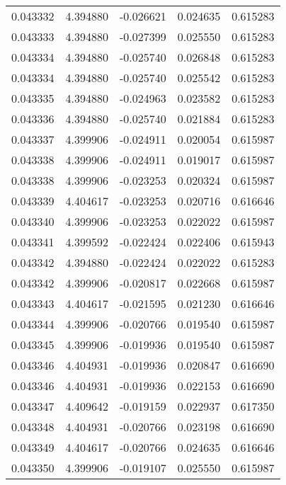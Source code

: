 \begin{tabular}{lrrrr}
0.043332    &  4.394880 & -0.026621 &  0.024635 &             0.615283 \\
0.043333    &  4.394880 & -0.027399 &  0.025550 &             0.615283 \\
0.043334    &  4.394880 & -0.025740 &  0.026848 &             0.615283 \\
0.043334    &  4.394880 & -0.025740 &  0.025542 &             0.615283 \\
0.043335    &  4.394880 & -0.024963 &  0.023582 &             0.615283 \\
0.043336    &  4.394880 & -0.025740 &  0.021884 &             0.615283 \\
0.043337    &  4.399906 & -0.024911 &  0.020054 &             0.615987 \\
0.043338    &  4.399906 & -0.024911 &  0.019017 &             0.615987 \\
0.043338    &  4.399906 & -0.023253 &  0.020324 &             0.615987 \\
0.043339    &  4.404617 & -0.023253 &  0.020716 &             0.616646 \\
0.043340    &  4.399906 & -0.023253 &  0.022022 &             0.615987 \\
0.043341    &  4.399592 & -0.022424 &  0.022406 &             0.615943 \\
0.043342    &  4.394880 & -0.022424 &  0.022022 &             0.615283 \\
0.043342    &  4.399906 & -0.020817 &  0.022668 &             0.615987 \\
0.043343    &  4.404617 & -0.021595 &  0.021230 &             0.616646 \\
0.043344    &  4.399906 & -0.020766 &  0.019540 &             0.615987 \\
0.043345    &  4.399906 & -0.019936 &  0.019540 &             0.615987 \\
0.043346    &  4.404931 & -0.019936 &  0.020847 &             0.616690 \\
0.043346    &  4.404931 & -0.019936 &  0.022153 &             0.616690 \\
0.043347    &  4.409642 & -0.019159 &  0.022937 &             0.617350 \\
0.043348    &  4.404931 & -0.020766 &  0.023198 &             0.616690 \\
0.043349    &  4.404617 & -0.020766 &  0.024635 &             0.616646 \\
0.043350    &  4.399906 & -0.019107 &  0.025550 &             0.615987 \\

\end{tabular}
